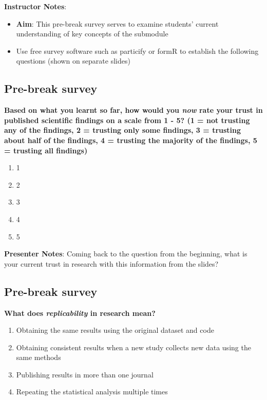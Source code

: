 \documentclass[
  letterpaper,
  DIV=11,
  numbers=noendperiod]{scrartcl}
\begin{document}
\textbf{Instructor Notes}:

\begin{itemize}
\item
  \textbf{Aim}: This pre-break survey serves to examine students'
  current understanding of key concepts of the submodule
\item
  Use free survey software such as particify or formR to establish the
  following questions (shown on separate slides)
\end{itemize}

\subsection{Pre-break survey}\label{pre-break-survey-1}

\textbf{Based on what you learnt so far, how would you \emph{now} rate
your trust in published scientific findings on a scale from 1 - 5? (1 =
not trusting any of the findings, 2 = trusting only some findings, 3 =
trusting about half of the findings, 4 = trusting the majority of the
findings, 5 = trusting all findings)}

\begin{enumerate}
\def\labelenumi{\alph{enumi}.}
\item
  1
\item
  2
\item
  3
\item
  4
\item
  5
\end{enumerate}

\textbf{Presenter Notes}: Coming back to the question from the
beginning, what is your current trust in research with this information
from the slides?

\subsection{Pre-break survey}\label{pre-break-survey-2}

\textbf{What does \emph{replicability} in research mean?}

\begin{enumerate}
\def\labelenumi{\alph{enumi}.}
\item
  Obtaining the same results using the original dataset and code
\item
  Obtaining consistent results when a new study collects new data using
  the same methods
\item
  Publishing results in more than one journal
\item
  Repeating the statistical analysis multiple times
\end{enumerate}
\end{document}
